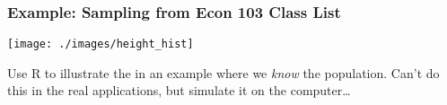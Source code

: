 \documentclass{beamer}
\begin{document}
%



\begin{frame}
\frametitle{Example: Sampling from Econ 103 Class List}
\begin{center}
\texttt{[image: ./images/height\_hist]}
\end{center}
\alert{Use R to illustrate the in an example where we \emph{know} the population.  
Can't do this in the real applications, but simulate it on the computer\dots}
\end{frame}

%
%
%
%
%
%
%
%
%
%
%
%
%
%
%
%
%
%
%
%
%
%
\end{document}
